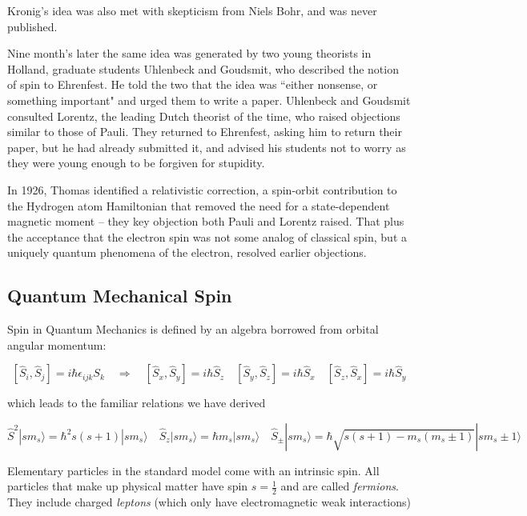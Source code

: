 Kronig's idea was also met with skepticism from Niels Bohr, and was never
published. 

Nine month's later the same idea was generated by two young theorists in
Holland, graduate students Uhlenbeck and Goudsmit, who described the notion of
spin to Ehrenfest. He told the two that the idea was ``either nonsense, or
something important" and urged them to write a paper. Uhlenbeck and Goudsmit
consulted Lorentz, the leading Dutch theorist of the time, who raised
objections similar to those of Pauli. They returned to Ehrenfest, asking him to
return their paper, but he had already submitted it, and advised his students
not to worry as they were young enough to be forgiven for stupidity. 

In 1926, Thomas identified a relativistic correction, a spin-orbit contribution
to the Hydrogen atom Hamiltonian that removed the need for a state-dependent
magnetic moment -- they key objection both Pauli and Lorentz raised. That plus
the acceptance that the electron spin was not some analog of classical spin,
but a uniquely quantum phenomena of the electron, resolved earlier objections. 


\subsection{Quantum Mechanical Spin} 

Spin in Quantum Mechanics is defined by an algebra borrowed from orbital
angular momentum: 

\[
  [\hat{S}_i, \hat{S}_j ]  = i\hbar \epsilon_{ijk} S_k \quad \Rightarrow \quad
  [\hat{S}_x, \hat{S}_y ] = i\hbar \hat{S}_z \quad [\hat{S}_y, \hat{S}_z]
  = i\hbar \hat{S}_x \quad [\hat{S}_z, \hat{S}_x ] = i\hbar \hat{S}_y 
\] \vspace{3px}

which leads to the familiar relations we have derived 

\[
\hat{S}^2 |sm_s\rangle = \hbar^2 s(s+1)|sm_s\rangle \quad \hat{S}_z |s m_s
\rangle = \hbar m_s | sm_s \rangle \quad  \hat{S}_\pm | sm_s \rangle = \hbar
\sqrt{s(s+1) - m_s (m_s \pm 1 )} |sm_s \pm 1 \rangle
\] \vspace{3px}

Elementary particles in the standard model come with an intrinsic spin. All
particles that make up physical matter have spin $s = \frac{1}{2}$ and are
called \textit{fermions}. They include charged \textit{leptons} (which only
have electromagnetic weak interactions)

